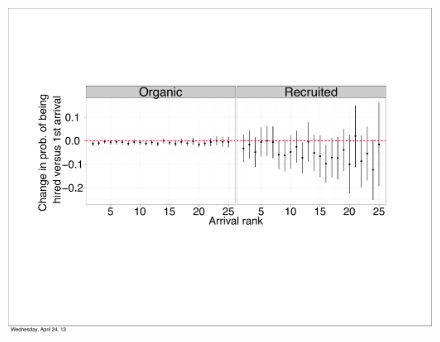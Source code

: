 \documentclass[12pt]{beamer}
\begin{document}
\begin{frame}{}
\begin{animateinline}[autoplay]{10}
\end{animateinline}
\end{frame}

\begin{frame}{}
\begin{figure}[H] \centering \includegraphics[trim=1.8cm 6cm 1mm 5cm,clip=true,width=120mm]{present_pdf4.pdf} \end{figure}
\end{frame}
\end{document}
